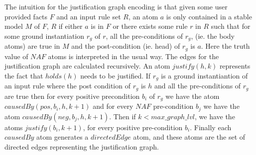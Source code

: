 The intuition for the justification graph encoding is that given some user
provided facts $F$ and an input rule set $R$, an atom $a$ is only contained in
a stable model $M$ of $F$, $R$ if either $a$ is in $F$ or there exists some
rule $r$ in $R$ such that for some ground instantiation $r_{g}$ of $r$, all
the pre-conditions of $r_{g}$, (ie. the body atoms) are true in $M$ and the
post-condition (ie. head) of $r_{g}$ is $a$. Here the truth value of $NAF$
atoms is interpreted in the usual way. The edges for the justification graph
are calculated recursively. An atom $justify(h,k)$ represents the fact that
$holds(h)$ needs to be justified. If $r_{g}$ is a ground instantiantion of an
input rule where the post condition of $r_{g}$ is $h$ and all the
pre-conditions of $r_{g}$ are true then for every positive precondition
$b_{i}$ of $r_{g}$ we have the atom $causedBy(pos,b_{i},h,k+1)$ and for every
$NAF$ pre-condition $b_{j}$ we have the atom $causedBy(neg,b_{j},h,k+1)$. Then
if $k<max\_graph\_lvl$, we have the atoms $justify(b_{i},k+1)$, for every
positive pre-condition $b_{i}$. Finally each $causedBy$ atom generates a
$directedEdge$ atom, and these atoms are the set of directed edges
representing the justification graph.


